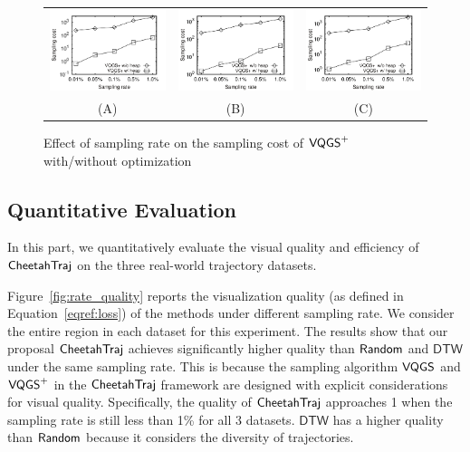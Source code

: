 \begin{figure}
	\centering
	\small
	\begin{tabular}{ccc}
		\includegraphics[width=0.3\linewidth]{pictures/quantitative_study/vqgs_porto_t}
		&
		\includegraphics[width=0.3\linewidth]{pictures/quantitative_study/vqgs_sz_t}
		&
		\includegraphics[width=0.3\linewidth]{pictures/quantitative_study/vqgs_cd_t}
		\\
		(A) \pt{}
		&
		(B) \sz{}
		&
		(C) \cd{}
	\end{tabular}
    \trim
	\caption{Effect of sampling rate on the sampling cost of $\mathsf{VQGS}^+$ with/without optimization}
	\label{fig:rate_algtime}
	\trim \trim
\end{figure}

\subsection{Quantitative Evaluation}\label{sec:quality}
In this part, we quantitatively evaluate the visual quality and efficiency of $\mathsf{CheetahTraj}$ on the three real-world trajectory datasets.

 Figure~\ref{fig:rate_quality} reports the visualization quality (as defined in Equation~\eqref{eqref:loss}) of the methods under different sampling rate.
We consider the entire region in each dataset for this experiment.
The results show that our proposal $\mathsf{CheetahTraj}$ achieves significantly higher quality than $\mathsf{Random}$ and $\mathsf{DTW}$ under the same sampling rate.
This is because the sampling algorithm $\mathsf{VQGS}$ and $\mathsf{VQGS}^+$ in the $\mathsf{CheetahTraj}$ framework are designed with explicit considerations for visual quality.
Specifically, the quality of $\mathsf{CheetahTraj}$ approaches 1 when the sampling rate is still less than 1\% for all 3 datasets.
$\mathsf{DTW}$ has a higher quality than $\mathsf{Random}$ because it considers the diversity of trajectories.


